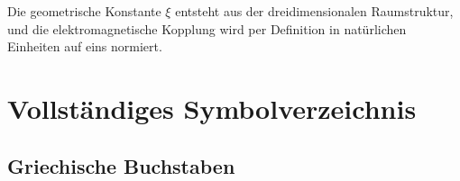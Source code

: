 \documentclass[12pt,a4paper]{report}
\begin{document}
	Die geometrische Konstante $\xi$ entsteht aus der dreidimensionalen Raumstruktur, und die elektromagnetische Kopplung wird per Definition in natürlichen Einheiten auf eins normiert.
	
	\appendix
	\chapter{Vollständiges Symbolverzeichnis}
	\label{app:complete_symbols}
	
	\section{Griechische Buchstaben}
	\label{sec:greek_letters}
	
\end{document}
